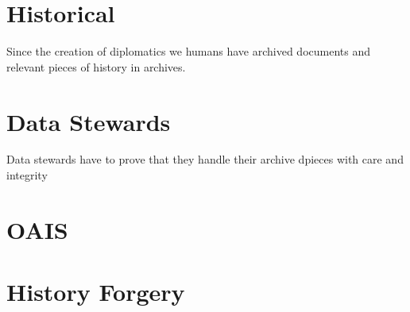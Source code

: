 \section{Historical}
Since the creation of diplomatics we humans have archived documents and relevant pieces of history in archives. 
\section{Data Stewards}
Data stewards have to prove that they handle their archive dpieces with care and integrity
\section{OAIS}
\section{History Forgery}
